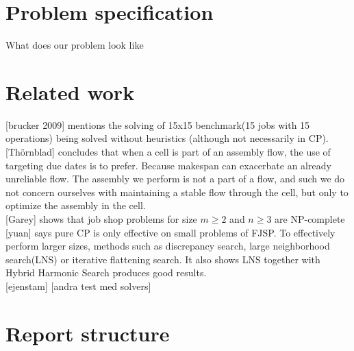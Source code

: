 \section{Problem specification}
What does our problem look like

\section{Related work}
[brucker 2009] mentions the solving of 15x15 benchmark(15 jobs with 15 operations) being solved without heuristics (although not necessarily in CP).\cite{brucker_2009}
\\

[Thörnblad] concludes that when a cell is part of an assembly flow, the use of targeting due dates is to prefer. Because makespan can exacerbate an already unreliable flow. The assembly we perform is not a part of a flow, and such we do not concern ourselves with maintaining a stable flow through the cell, but only to optimize the assembly in the cell.\cite{thornblad_2013}
\\

[Garey] shows that job shop problems for size $m \geq 2$ and $n \geq 3$ are NP-complete \cite{garey_1976}
\\

[yuan] says pure CP is only effective on small problems of FJSP. To effectively perform larger sizes, methods such as discrepancy search, large neighborhood search(LNS) or iterative flattening search. It also shows LNS together with Hybrid Harmonic Search produces good results.\cite{yuan_2013}
\\

[ejenstam]
[andra test med solvers]

\section{Report structure}
